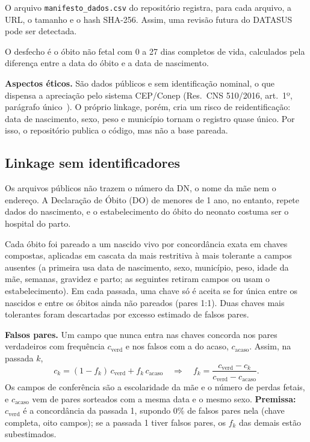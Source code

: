 \documentclass[12pt]{article}
\begin{document}
O arquivo \texttt{manifesto\_dados.csv} do repositório registra, para cada arquivo, a URL, o tamanho e o hash SHA-256. Assim, uma revisão futura do DATASUS pode ser detectada.

O desfecho é o óbito não fetal com 0 a 27 dias completos de vida, calculados pela diferença entre a data do óbito e a data de nascimento.

\textbf{Aspectos éticos.} São dados públicos e sem identificação nominal, o que dispensa a apreciação pelo sistema CEP/Conep (Res.\ CNS 510/2016, art.~1º, parágrafo único~\cite{cns510}). O próprio linkage, porém, cria um risco de reidentificação: data de nascimento, sexo, peso e município tornam o registro quase único. Por isso, o repositório publica o código, mas não a base pareada.

\subsection{Linkage sem identificadores}

Os arquivos públicos não trazem o número da DN, o nome da mãe nem o endereço. A Declaração de Óbito (DO) de menores de 1 ano, no entanto, repete dados do nascimento, e o estabelecimento do óbito do neonato costuma ser o hospital do parto.

Cada óbito foi pareado a um nascido vivo por concordância exata em \nPassadas{} chaves compostas, aplicadas em cascata da mais restritiva à mais tolerante a campos ausentes (a primeira usa data de nascimento, sexo, município, peso, idade da mãe, semanas, gravidez e parto; as seguintes retiram campos ou usam o estabelecimento). Em cada passada, uma chave só é aceita se for única entre os nascidos e entre os óbitos ainda não pareados (pares 1:1). Duas chaves mais tolerantes foram descartadas por excesso estimado de falsos pares.

\textbf{Falsos pares.} Um campo que nunca entra nas chaves concorda nos pares verdadeiros com frequência $c_{\text{verd}}$ e nos falsos com a do acaso, $c_{\text{acaso}}$. Assim, na passada $k$,
\begin{equation}
c_k = (1-f_k)\,c_{\text{verd}} + f_k\,c_{\text{acaso}}
\quad\Rightarrow\quad
f_k = \frac{c_{\text{verd}} - c_k}{c_{\text{verd}} - c_{\text{acaso}}}.
\end{equation}
Os campos de conferência são a escolaridade da mãe e o número de perdas fetais, e $c_{\text{acaso}}$ vem de pares sorteados com a mesma data e o mesmo sexo. \textbf{Premissa:} $c_{\text{verd}}$ é a concordância da passada 1, supondo 0\% de falsos pares nela (chave completa, oito campos); se a passada 1 tiver falsos pares, os $f_k$ das demais estão subestimados.
\end{document}
